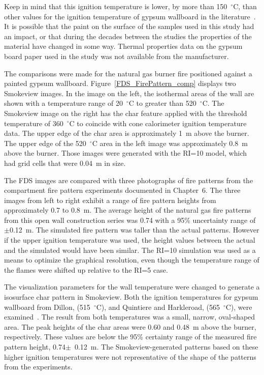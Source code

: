 \documentclass[twoside]{uocthesis}
\begin{document}
{Keep in mind that this ignition temperature is lower, by more than 150~$^\circ$C, than other values for the ignition temperature of gypsum wallboard in the literature~\cite{Dillon:1998,Babrauskas:2003}.  It is possible that the paint on the surface of the samples used in this study had an impact, or that during the decades between the studies the properties of the material have changed in some way.  Thermal properties data on the gypsum board paper used in the study was not available from the manufacturer.  

The comparisons were made for the natural gas burner fire positioned against a painted gypsum wallboard.  Figure~\ref{FDS_FirePattern_comp} displays two Smokeview images.  In the image on the left, the isothermal areas of the wall are shown with a temperature range of 20~$^\circ$C to greater than 520~$^\circ$C.  The Smokeview image on the right has the char feature applied with the threshold temperature of 360~$^\circ$C to coincide with cone calorimeter ignition temperature data. The upper edge of the char area is approximately 1~m above the burner.  The upper edge of the 520~$^\circ$C area in the left image was approximately 0.8~m above the burner. Those images were generated with the RI=10 model, which had grid cells that were 0.04~m in size. 

The FDS images are compared with three photographs of fire patterns from the compartment fire pattern experiments documented in Chapter~6.  The three images from left to right exhibit a range of fire pattern heights from approximately 0.7 to 0.8~m.  The average height of the natural gas fire patterns from this open wall construction series was 0.74 with a 95\% uncertainty range of $\pm$0.12~m. The simulated fire pattern was taller than the actual patterns.  However if the upper ignition temperature was used, the height values between the actual and the simulated would have been similar.  The RI=10 simulation was used as a means to optimize the graphical resolution, even though the temperature range of the flames were shifted up relative to the RI=5 case.   

The visualization parameters for the wall temperature were changed to generate a isosurface char pattern in Smokeview.  Both the ignition temperatures for gypsum wallboard from Dillon, (515~$^\circ$C), and Quintiere and Harkleroad, (565~$^\circ$C), were examined~\cite{Dillon:1998,Quintiere:1985}.  The result from both temperatures was a small, narrow, oval-shaped area.  The peak heights of the char areas were 0.60 and 0.48~m above the burner, respectively.  These values are below the 95\% certainty range of the measured fire pattern height, 0.74$\pm$~0.12~m. The Smokeview-generated patterns based on these higher ignition temperatures were not representative of the shape of the patterns from the experiments.

}
\end{document}
